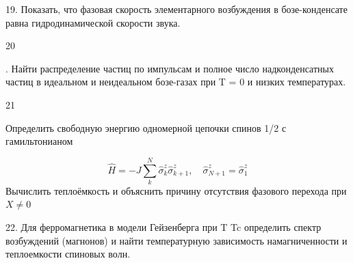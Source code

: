 \documentclass[a4paper,12pt]{article} %
\begin{document}
\begin{ttask}

19. Показать, что фазовая скорость элементарного возбуждения в бозе-конденсате равна гидродинамической скорости звука.


















\end{ttask}



\begin{ttask}

20

. Найти распределение частиц по импульсам и полное число надконденсатных частиц в идеальном и неидеальном бозе-газах при T = 0 и низких температурах.


















\end{ttask}



\begin{ttask}

21

Определить свободную энергию одномерной цепочки спинов 1/2 с гамильтонианом

$$\hat{H}=-J \sum_{k}^{N} \hat{\sigma}_{k}^{z} \hat{\sigma}_{k+1}^{z}, \quad \hat{\sigma}_{N+1}^{z}=\hat{\sigma}_{1}^{z}$$
Вычислить теплоёмкость и объяснить причину отсутствия фазового перехода при $ X\ne 0 $
















\end{ttask}



\begin{ttask}

22. Для ферромагнетика в модели Гейзенберга при T  Tc определить спектр возбуждений (магнонов) и найти температурную зависимость намагниченности и теплоемкости спиновых волн.

















\end{ttask}
\end{document}
